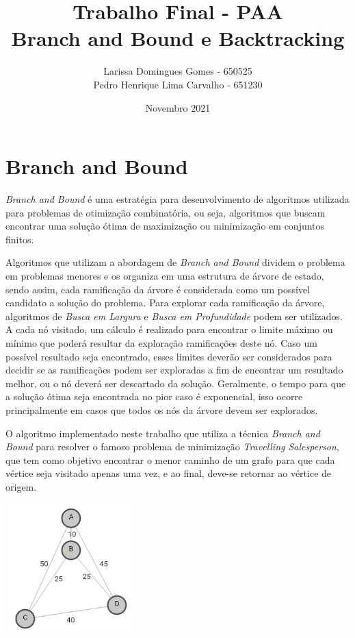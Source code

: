 \documentclass{article}
\title{Trabalho Final - PAA \\ Branch and Bound e Backtracking}
\author{Larissa Domingues Gomes - 650525 \\
Pedro Henrique Lima Carvalho - 651230}
\date{Novembro 2021}
\begin{document}
\maketitle

\section{Branch and Bound}
\textit{Branch and Bound} é uma estratégia para desenvolvimento de algoritmos utilizada para problemas de otimização combinatória, ou seja, algoritmos que buscam encontrar uma solução ótima de maximização ou minimização em conjuntos finitos. 

\par Algoritmos que utilizam a abordagem de \textit{Branch and Bound} dividem o problema em problemas menores e os organiza em uma estrutura de árvore de estado, sendo assim, cada ramificação da árvore é considerada como um possível candidato a solução do problema. Para explorar cada ramificação da árvore, algoritmos de \textit{Busca em Largura} e \textit{Busca em Profundidade} podem ser utilizados. A cada nó visitado, um cálculo é realizado para encontrar o limite máximo ou mínimo que poderá resultar da exploração ramificações deste nó. Caso um possível resultado seja encontrado, esses limites deverão ser considerados para decidir se as ramificações podem ser exploradas a fim de encontrar um resultado melhor, ou o nó deverá ser descartado da solução. Geralmente, o tempo para que a solução ótima seja encontrada no pior caso é exponencial, isso ocorre principalmente em casos que todos os nós da árvore devem ser explorados. 

\par O algoritmo implementado neste trabalho que utiliza a técnica \textit{Branch and Bound} para resolver o famoso problema de minimização \textit{Travelling Salesperson}, que tem como objetivo encontrar o menor caminho de um grafo para que cada vértice seja visitado apenas uma vez, e ao final, deve-se retornar ao vértice de origem.
\begin{center}
\par \includegraphics[width=5cm, height=5cm]{grafoTSP.png} \par
\end{center}
\end{document}
